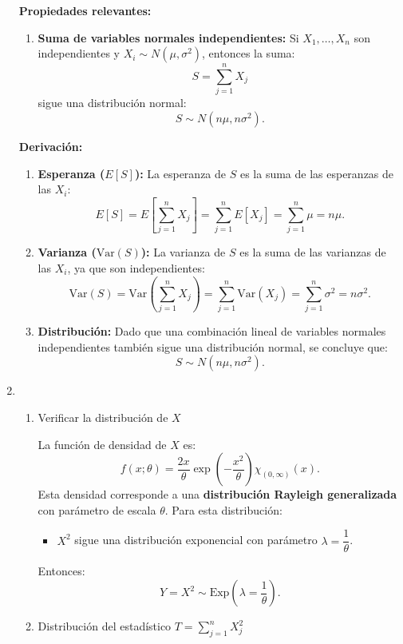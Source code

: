 \begin{enumerate}[label=\color{red}\textbf{\arabic*)}]
        \textbf{Propiedades relevantes:}
        \begin{enumerate}[label=\arabic*)]
            \item \textbf{Suma de variables normales independientes:} Si $X_1,\dots,X_n$ son independientes y $X_i\sim N(\mu,\sigma^2)$, entonces la suma: \[
            S=\sum_{j=1}^{n} X_j
            \] sigue una distribución normal: \[
            S\sim N(n\mu,n\sigma^2).
            \] 
        \end{enumerate}
        \textbf{Derivación:}
        \begin{enumerate}[label=\arabic*)]
            \item \textbf{Esperanza ($E[S]$):} La esperanza de $S$ es la suma de las esperanzas de las  $X_i$:  \[
                    E[S]=E\left[ \sum_{j=1}^{n} X_j \right] =\sum_{j=1}^{n} E[X_j]=\sum_{j=1}^{n} \mu=n\mu.
            \] 
        \item \textbf{Varianza ($\mathrm{Var}(S)$):} La varianza de $S$ es la suma de las varianzas de las  $X_i$, ya que son independientes:  \[
        \mathrm{Var}(S)=\mathrm{Var}\left( \sum_{j=1}^{n} X_j \right) =\sum_{j=1}^{n} \mathrm{Var}(X_j)=\sum_{j=1}^{n} \sigma^2=n\sigma^2.
        \] 
    \item \textbf{Distribución:} Dado que una combinación lineal de variables normales independientes también sigue una distribución normal, se concluye que: \[
    S\sim N(n\mu,n\sigma^2).
    \]  
        \end{enumerate}
    \item {}

\begin{enumerate}[label=Paso \arabic*:]
    \item Verificar la distribución de $X$

        La función de densidad de  $X$ es:  \[
        f(x;\theta)=\dfrac{2x}{\theta}\exp\left( -\dfrac{x^2}{\theta} \right) \chi_{(0,\infty)}(x).
        \] 
        Esta densidad corresponde a una \textbf{distribución Rayleigh generalizada} con parámetro de escala $\theta$. Para esta distribución:
        \begin{itemize}[label=\textbullet]
            \item $X^2$ sigue una distribución exponencial con parámetro $\lambda=\dfrac{1}{\theta}$.
        \end{itemize}
        Entonces: \[
        Y=X^2\sim \mathrm{Exp}\left( \lambda=\dfrac{1}{\theta} \right) .
        \] 
    \item Distribución del estadístico $T=\sum_{j=1}^{n} X_j^2$ 


\end{enumerate}
\end{enumerate}
